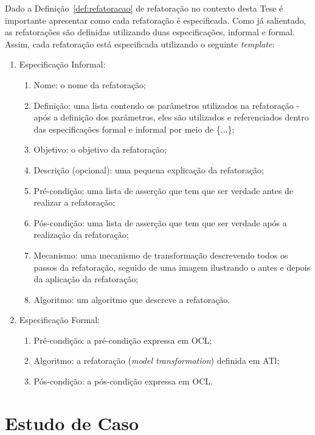 Dado a Definição~\ref{def:refatoracao} de refatoração no contexto desta Tese é importante apresentar como cada refatoração é especificada. Como já salientado, as refatorações são definidas utilizando duas especificações, informal e formal. Assim, cada refatoração está especificada utilizando o seguinte \textit{template}:

\begin{enumerate}
	\item Especificação Informal:
		\begin{enumerate}
			\item Nome: o nome da refatoração;
			\item Definição: uma lista contendo os parâmetros utilizados na refatoração - após a definição dos parâmetros, eles são utilizados e referenciados dentro das especificações formal e informal por meio de \{...\};
			\item Objetivo: o objetivo da refatoração;
			\item Descrição (opcional): uma pequena explicação da refatoração;
			\item Pré-condição: uma lista de asserção que tem que ser verdade antes de realizar a refatoração;
			\item Pós-condição: uma lista de asserção que tem que ser verdade após a realização da refatoração;
			\item Mecanismo: uma mecanismo de transformação descrevendo todos os passos da refatoração, seguido de uma imagem ilustrando o antes e depois da aplicação da refatoração;
			\item Algoritmo: um algoritmo que descreve a refatoração.
		\end{enumerate}
	\item Especificação Formal:
		\begin{enumerate}
			\item Pré-condição: a pré-condição expressa em OCL;
			\item Algoritmo: a refatoração (\textit{model transformation}) definida em ATl;
			\item Pós-condição: a pós-condição expressa em OCL.
		\end{enumerate}
\end{enumerate}


\section{Estudo de Caso}

